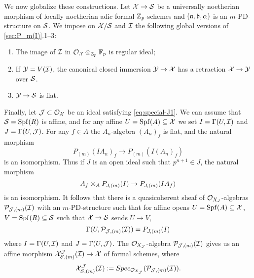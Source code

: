 \documentclass{article}
\theoremstyle{change}
\numberwithin{equation}{subsubsection}
\begin{document}
We now globalize these constructions. Let ${\cal X}\to{\cal S}$ be a universally
noetherian morphism of locally noetherian adic formal ${\mathbb Z}_p$-schemes
and $({\mathfrak a},{\mathfrak b},\alpha)$ is an $m$-PD-structure on ${\cal S}$. We impose on
${\cal X}/{\cal S}$ and ${\cal I}$ the following global versions of
\ref{sec:P_m(I)}.1--3:
\begin{enumerate}
\item The image of ${\cal I}$ in ${\cal O}_{\cal X}\otimes_{{\mathbb Z}_p}{\mathbb{F}}_p$ is regular
  ideal;
\item If ${\cal Y}=V({\cal I})$, the canonical closed immersion ${\cal Y}\to{\cal X}$ has
  a retraction ${\cal X}\to{\cal Y}$ over ${\cal S}$.
\item ${\cal Y}\to{\cal S}$ is flat.
\end{enumerate}
Finally, let ${\cal J}\subset{\cal O}_{\cal X}$ be an ideal satisfying
\ref{eq:special-J1}. We can assume that ${\cal S}={\operatorname{Spf}({R})}$ is affine, and
for any affine $U={\operatorname{Spf}({A})}\subseteq{\cal X}$ we set $I=\Gamma(U,{\cal I})$ and
$J=\Gamma(U,{\cal J})$. For any $f\in A$ the $A_n$-algebra $(A_n)_f$ is
flat, and the natural morphism
\begin{displaymath}
  P_{(m)}(IA_n)_f\to P_{(m)}(I(A_n)_f)
\end{displaymath}
is an isomorphism. Thus if $J$ is an open ideal such that
$p^{n+1}\in J$, the natural morphism
\begin{displaymath}
  A_f\otimes_AP_{J,(m)}(I)\to P_{J,(m)}(IA_f)
\end{displaymath}
is an isomorphism. It follows that there is a quasicoherent sheaf of
${\cal O}_{X_J}$-algebras ${\cal P}_{{\cal J},(m)}({\cal I})$ with an $m$-PD-structure such
that for affine opens $U={\operatorname{Spf}({A})}\subseteq{\cal X}$, $V={\operatorname{Spf}({R})}\subseteq{\cal S}$ such
that ${\cal X}\to{\cal S}$ sends $U\to V$,
\begin{displaymath}
  \Gamma(U,{\cal P}_{{\cal J},(m)}({\cal I}))=P_{J,(m)}(I)
\end{displaymath}
where $I=\Gamma(U,{\cal I})$ and $J=\Gamma(U,{\cal J})$. The
${\cal O}_{X_{\cal J}}$-algebra ${\cal P}_{{\cal J},(m)}({\cal I})$ gives us an affine morphism
${\cal X}_{{\cal S},(m)}^{\cal J}({\cal I})\to{\cal X}$ of formal schemes, where
\begin{equation}
  \label{eq:X_(m),SJ}
  {\cal X}_{{\cal S},(m)}^{\cal J}({\cal I}):=Spec_{{\cal O}_{X_{\cal J}}}({\cal P}_{{\cal J},(m)}({\cal I})).   
\end{equation}
\end{document}
